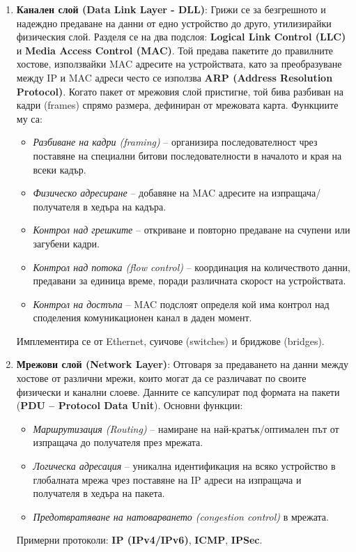 \documentclass{scrartcl}
\begin{document}
\begin{FlushLeft}
\begin{enumerate}
    \item \textbf{Канален слой (Data Link Layer - DLL)}: Грижи се за безгрешното и надеждно предаване на данни от едно устройство до друго, утилизирайки физическия слой. Разделя се на два подслоя: \textbf{Logical Link Control (LLC)} и \textbf{Media Access Control (MAC)}. Той предава пакетите до правилните хостове, използвайки MAC адресите на устройствата, като за преобразуване между IP и MAC адреси често се използва \textbf{ARP (Address Resolution Protocol)}. Когато пакет от мрежовия слой пристигне, той бива разбиван на кадри (frames) спрямо размера, дефиниран от мрежовата карта. Функциите му са:
    \begin{itemize}
        \item \textit{Разбиване на кадри (framing)} – организира последователност чрез поставяне на специални битови последователности в началото и края на всеки кадър.
        \item \textit{Физическо адресиране} – добавяне на MAC адресите на изпращача/получателя в хедъра на кадъра.
        \item \textit{Контрол над грешките} – откриване и повторно предаване на счупени или загубени кадри.
        \item \textit{Контрол над потока (flow control)} – координация на количеството данни, предавани за единица време, поради различната скорост на устройствата.
        \item \textit{Контрол на достъпа} – MAC подслоят определя кой има контрол над споделения комуникационен канал в даден момент.
    \end{itemize}
    Имплементира се от Ethernet, суичове (switches) и бриджове (bridges).

    \item \textbf{Мрежови слой (Network Layer)}: Отговаря за предаването на данни между хостове от различни мрежи, които могат да се различават по своите физически и канални слоеве. Данните се капсулират под формата на пакети (\textbf{PDU – Protocol Data Unit}). Основни функции:
    \begin{itemize}
        \item \textit{Маршрутизация (Routing)} – намиране на най-кратък/оптимален път от изпращача до получателя през мрежата.
        \item \textit{Логическа адресация} – уникална идентификация на всяко устройство в глобалната мрежа чрез поставяне на IP адреси на изпращача и получателя в хедъра на пакета.
        \item \textit{Предотвратяване на натоварването (congestion control)} в мрежата.
    \end{itemize}
    Примерни протоколи: \textbf{IP (IPv4/IPv6)}, \textbf{ICMP}, \textbf{IPSec}.


\end{enumerate}
\end{FlushLeft}
\end{document}
